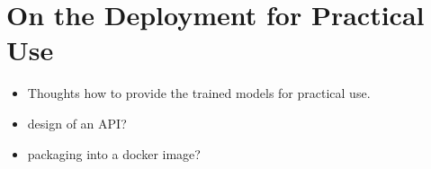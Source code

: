 \section{On the Deployment for Practical Use}
\begin{itemize}
    \item Thoughts how to provide the trained models for practical use.
    \item design of an API?
    \item packaging into a docker image?
\end{itemize}

\newpage
